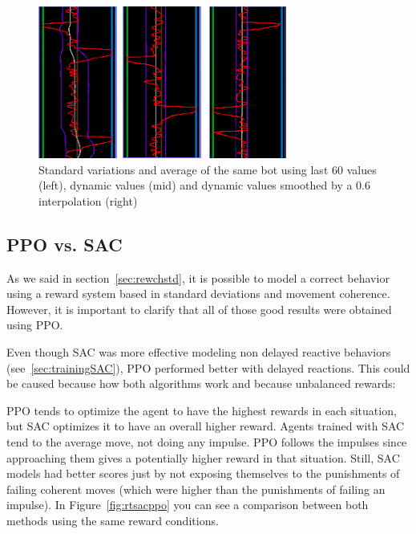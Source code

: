 \begin{figure}[h]
  \centering
		\includegraphics[width=.6\textwidth]{img/stdVariations.png}
  \caption{Standard variations and average of the same bot using last 60 values (left), dynamic values (mid) and dynamic values smoothed by a 0.6 interpolation (right)}
  \label{fig:stdVariations}
\end{figure}

\subsection{PPO vs. SAC}

As we said in section~\ref{sec:rewchstd}, it is possible to model a correct behavior using a reward system based in standard deviations and movement coherence. However, it is important to clarify that all of those good results were obtained using PPO.

Even though SAC was more effective modeling non delayed reactive behaviors (see~\ref{sec:trainingSAC}), PPO performed better with delayed reactions. This could be caused because how both algorithms work and because unbalanced rewards:

PPO tends to optimize the agent to have the highest rewards in each situation, but SAC optimizes it to have an overall higher reward. Agents trained with SAC tend to the average move, not doing any impulse. PPO follows the impulses since approaching them gives a potentially higher reward in that situation. Still, SAC models had better scores just by not exposing themselves to the punishments of failing coherent moves (which were higher than the punishments of failing an impulse). In Figure~\ref{fig:rtsacppo} you can see a comparison between both methods using the same reward conditions.


